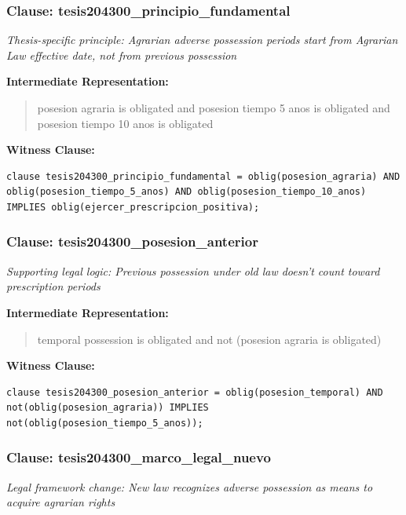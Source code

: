 \documentclass[11pt,a4paper]{article}
\begin{document}
\subsubsection{Clause: tesis204300\_principio\_fundamental}

\textit{Thesis-specific principle: Agrarian adverse possession periods start from Agrarian Law effective date, not from previous possession}

\textbf{Intermediate Representation:}

\begin{quote}
posesion agraria is obligated and posesion tiempo 5 anos is obligated and posesion tiempo 10 anos is obligated
\end{quote}

\textbf{Witness Clause:}

\begin{lstlisting}[style=witnessstyle, language=Witness]
clause tesis204300_principio_fundamental = oblig(posesion_agraria) AND oblig(posesion_tiempo_5_anos) AND oblig(posesion_tiempo_10_anos) IMPLIES oblig(ejercer_prescripcion_positiva);
\end{lstlisting}

\subsubsection{Clause: tesis204300\_posesion\_anterior}

\textit{Supporting legal logic: Previous possession under old law doesn't count toward prescription periods}

\textbf{Intermediate Representation:}

\begin{quote}
temporal possession is obligated and not (posesion agraria is obligated)
\end{quote}

\textbf{Witness Clause:}

\begin{lstlisting}[style=witnessstyle, language=Witness]
clause tesis204300_posesion_anterior = oblig(posesion_temporal) AND not(oblig(posesion_agraria)) IMPLIES not(oblig(posesion_tiempo_5_anos));
\end{lstlisting}

\subsubsection{Clause: tesis204300\_marco\_legal\_nuevo}

\textit{Legal framework change: New law recognizes adverse possession as means to acquire agrarian rights}
\end{document}
